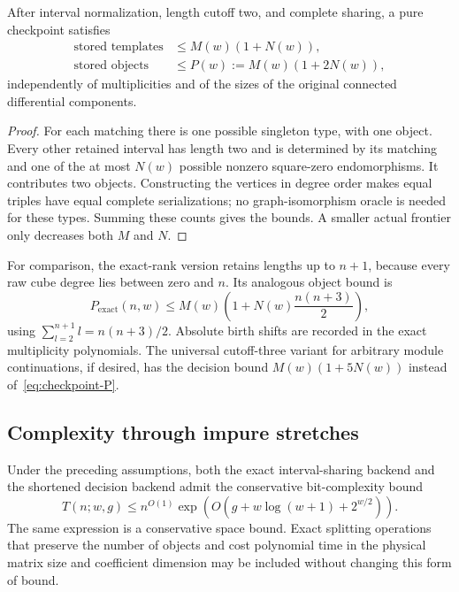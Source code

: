 \begin{samepage}
\begin{proposition}
\label{prop:checkpoint-size}
After interval normalization, length cutoff two, and complete sharing,
a pure checkpoint satisfies
\begin{equation}\label{eq:checkpoint-P}
\begin{aligned}
 \text{stored templates}&\le M(w)(1+N(w)),\\
 \text{stored objects}&\le P(w):=M(w)(1+2N(w)),
\end{aligned}
\end{equation}
independently of multiplicities and of the sizes of the
original connected differential components.
\end{proposition}
\end{samepage}

\begin{proof}
For each matching there is one possible singleton type, with one object.
Every other retained interval has length two and is determined by its
matching and one of the at most $N(w)$ possible nonzero square-zero
endomorphisms. It contributes two objects. Constructing the vertices
in degree order makes equal triples have equal complete serializations;
no graph-isomorphism oracle is needed for these types. Summing these
counts gives the bounds. A smaller actual frontier only decreases
both $M$ and $N$.
\end{proof}

For comparison, the exact-rank version retains lengths up to $n+1$,
because every raw cube degree lies between zero and $n$. Its analogous
object bound is
\begin{equation}\label{eq:exact-checkpoint-P}
 P_{\mathrm{exact}}(n,w)
 \le M(w)\left(1+N(w)\frac{n(n+3)}2\right),
\end{equation}
using $\sum_{l=2}^{n+1}l=n(n+3)/2$. Absolute birth shifts are recorded
in the exact multiplicity polynomials. The universal cutoff-three
variant for arbitrary module continuations, if desired, has the
decision bound $M(w)(1+5N(w))$ instead of~\eqref{eq:checkpoint-P}.

\subsection{Complexity through impure stretches}

\begin{theorem}
\label{thm:checkpoint-complexity}
Under the preceding assumptions, both the exact interval-sharing
backend and the shortened decision backend admit the conservative
bit-complexity bound
\begin{equation}\label{eq:checkpoint-runtime}
 T(n;w,g)\le n^{O(1)}
 \exp\!\left(O\!\left(g+w\log(w+1)+2^{w/2}\right)\right).
\end{equation}
The same expression is a conservative space bound. Exact splitting
operations that preserve the number of objects and cost polynomial
time in the physical matrix size and coefficient dimension may be
included without changing this form of bound.
\end{theorem}

